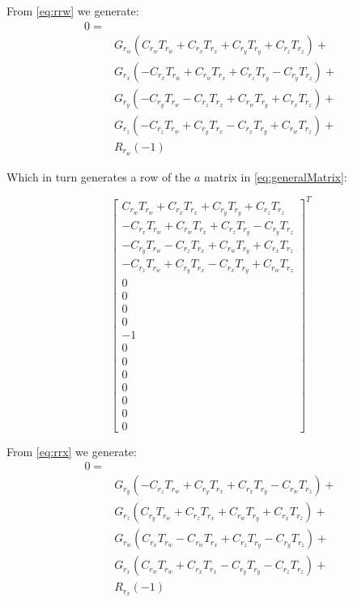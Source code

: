 \documentclass[12pt]{article}
\begin{document}
	From \autoref{eq:rrw} we generate:
	\begin{equation}
	    \begin{split}
	0= \\&
	G_{r_w} (C_{r_w} T_{r_w}+C_{r_x} T_{r_x}+C_{r_y} T_{r_y}+C_{r_z} T_{r_z})+\\&
	G_{r_x} (-C_{r_x} T_{r_w}+C_{r_w} T_{r_x}+C_{r_z} T_{r_y}-C_{r_y} T_{r_z})+\\&
	G_{r_y} (-C_{r_y} T_{r_w}-C_{r_z} T_{r_x}+C_{r_w} T_{r_y}+C_{r_x} T_{r_z})+\\&
	G_{r_z} (-C_{r_z} T_{r_w}+C_{r_y} T_{r_x}-C_{r_x} T_{r_y}+C_{r_w} T_{r_z})+\\&
	 R_{r_w}(-1)
	\end{split}
	\end{equation}
	
	Which in turn generates a row of the $a$ matrix in \autoref{eq:generalMatrix}:
	
	\begin{equation}
	    \begin{bmatrix}
	    C_{r_w} T_{r_w}+C_{r_x} T_{r_x}+C_{r_y} T_{r_y}+C_{r_z} T_{r_z}\\
	    -C_{r_x} T_{r_w}+C_{r_w} T_{r_x}+C_{r_z} T_{r_y}-C_{r_y} T_{r_z}\\
	    -C_{r_y} T_{r_w}-C_{r_z} T_{r_x}+C_{r_w} T_{r_y}+C_{r_x} T_{r_z}\\
	    -C_{r_z} T_{r_w}+C_{r_y} T_{r_x}-C_{r_x} T_{r_y}+C_{r_w} T_{r_z}\\
	    0 \\ 0 \\ 0 \\ 0 \\ -1 \\ 0 \\ 0 \\ 0 \\ 0 \\ 0 \\ 0 \\ 0
	    \end{bmatrix}^T
	\end{equation}
	
	
	From \autoref{eq:rrx} we generate:
	\begin{equation}
	    \begin{split}
	0= \\&
	G_{r_y} (-C_{r_z} T_{r_w}+C_{r_y} T_{r_x}+C_{r_x} T_{r_y}-C_{r_w} T_{r_z})+\\&
	G_{r_z} (C_{r_y} T_{r_w}+C_{r_z} T_{r_x}+C_{r_w} T_{r_y}+C_{r_x} T_{r_z})+\\&
	G_{r_w} (C_{r_x} T_{r_w}-C_{r_w} T_{r_x}+C_{r_z} T_{r_y}-C_{r_y} T_{r_z})+\\&
	G_{r_x} (C_{r_w} T_{r_w}+C_{r_x} T_{r_x}-C_{r_y} T_{r_y}-C_{r_z} T_{r_z})+\\&
	 R_{r_x}(-1)
	 \end{split}
	 \end{equation}
	
\end{document}
